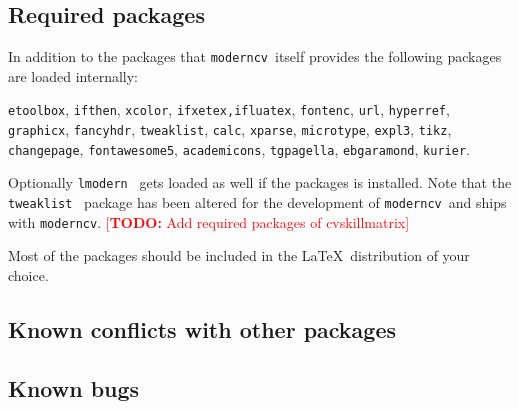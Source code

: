 \documentclass[a4paper,11pt]{article}
\newcommand{\todox}[1]{\textcolor{red}{[\textbf{TODO:} #1]}}
\newcommand{\code}[1]{\lstinline!#1!}
\newcommand{\Code}[1]{\lstinline!#1!~} %
\newcommand{\moderncv}{\code{moderncv}}
\newcommand{\Moderncv}{\Code{moderncv}}
\begin{document}
\subsection{Required packages}
\label{section:implementationDetails:requiredPackages}
In addition to the packages that \Moderncv itself provides the following packages are loaded internally:

\noindent
\code{etoolbox}, 
\code{ifthen}, 
\code{xcolor}, 
\code{ifxetex,ifluatex}, 
\code{fontenc}, 
\code{url}, 
\code{hyperref}, 
\code{graphicx}, 
\code{fancyhdr}, 
\code{tweaklist}, 
\code{calc}, 
\code{xparse}, 
\code{microtype}, 
\code{expl3}, 
\code{tikz}, 
\code{changepage}, 
\code{fontawesome5}, 
\code{academicons}, 
\code{tgpagella}, %
\code{ebgaramond}, %
\code{kurier}. %

Optionally \Code{lmodern} gets loaded as well if the packages is installed.
Note that the \Code{tweaklist} package has been altered for the development of \Moderncv and ships 
with \moderncv.
\todox{Add required packages of cvskillmatrix}

Most of the packages should be included in the \LaTeX\ distribution of your choice.

\subsection{Known conflicts with other packages}

\subsection{Known bugs}
\end{document}
